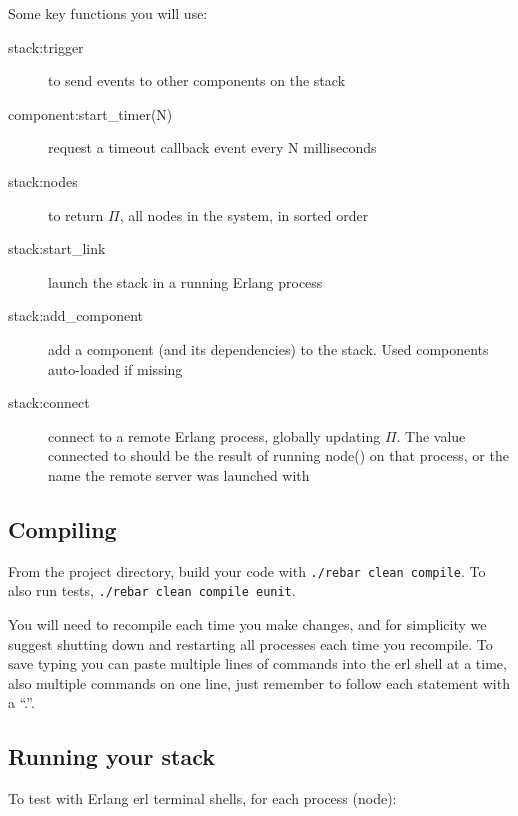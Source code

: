 \documentclass[a4paper]{article}
\begin{document}
Some key functions you will use:

\begin{description}
  \item[stack:trigger] to send events to other components on the stack
  \item[component:start\_timer(N)] request a timeout callback event every N milliseconds
  \item[stack:nodes] to return $\Pi$, all nodes in the system, in sorted order

  \item[stack:start\_link] launch the stack in a running Erlang process

  \item[stack:add\_component] add a component (and its dependencies) to the
  stack. Used components auto-loaded if missing

  \item[stack:connect] connect to a remote Erlang process, globally updating $\Pi$.
      The value connected to should be the result of running node() on that process, or the name the remote server was launched with
\end{description}


\subsection{Compiling} %
\label{sub:compiling_and_running_the_program}

From the project directory, build your code with \verb!./rebar clean compile!.
To also run tests, \verb!./rebar clean compile eunit!.

You will need to recompile each time you make changes, and for simplicity we
suggest shutting down and restarting all processes each time you recompile.
To save typing you can paste multiple lines of commands into the erl shell at
a time, also multiple commands on one line, just remember to follow each
statement with a ``.''.


\subsection{Running your stack} %
\label{sub:running_your_stack}


To test with Erlang erl terminal shells, for each process (node):
\end{document}
